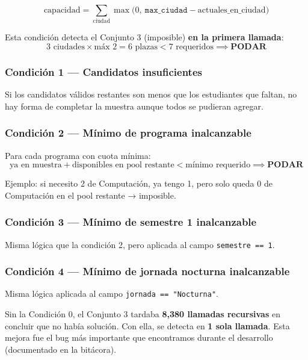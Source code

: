 \documentclass[11pt, a4paper]{article}
\begin{document}
\[
\text{capacidad} = \sum_{\text{ciudad}} \max\!\bigl(0,\ \texttt{max\_ciudad} - \text{actuales\_en\_ciudad}\bigr)
\]

\medskip
Esta condición detecta el Conjunto 3 (imposible) \textbf{en la primera llamada}:
\[
3 \text{ ciudades} \times \text{máx } 2 = 6 \text{ plazas} < 7 \text{ requeridos} \implies \textbf{PODAR}
\]

\subsubsection{Condición 1 — Candidatos insuficientes}

Si los candidatos válidos restantes son menos que los estudiantes que faltan, no hay forma de completar la muestra aunque todos se pudieran agregar.

\subsubsection{Condición 2 — Mínimo de programa inalcanzable}

Para cada programa con cuota mínima:
\[
\text{ya en muestra} + \text{disponibles en pool restante} < \text{mínimo requerido} \implies \textbf{PODAR}
\]

Ejemplo: si necesito 2 de Computación, ya tengo 1, pero solo queda 0 de Computación en el pool restante → imposible.

\subsubsection{Condición 3 — Mínimo de semestre 1 inalcanzable}

Misma lógica que la condición 2, pero aplicada al campo \texttt{semestre == 1}.

\subsubsection{Condición 4 — Mínimo de jornada nocturna inalcanzable}

Misma lógica aplicada al campo \texttt{jornada == "Nocturna"}.

\begin{porqueimporta}
Sin la Condición 0, el Conjunto 3 tardaba \textbf{8,380 llamadas recursivas} en concluir que no había solución. Con ella, se detecta en \textbf{1 sola llamada}. Esta mejora fue el bug más importante que encontramos durante el desarrollo (documentado en la bitácora).
\end{porqueimporta}
\end{document}
